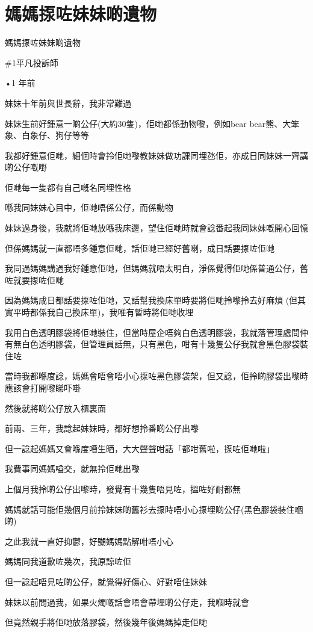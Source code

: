 \chapter{媽媽揼咗妹妹啲遺物}

媽媽揼咗妹妹啲遺物

\#1平凡投訴師

•1 年前

妹妹十年前與世長辭，我非常難過

妹妹生前好鍾意一啲公仔(大約30隻)，佢哋都係動物嚟，例如bear bear熊、大笨象、白象仔、狗仔等等

我都好鍾意佢哋，細個時會拎佢哋嚟教妹妹做功課同埋氹佢，亦成日同妹妹一齊講啲公仔嘅嘢

佢哋每一隻都有自己嘅名同埋性格

喺我同妹妹心目中，佢哋唔係公仔，而係動物

妹妹過身後，我就將佢哋放喺我床邊，望住佢哋時就會諗番起我同妹妹嘅開心回憶

但係媽媽就一直都唔多鍾意佢哋，話佢哋已經好舊喇，成日話要揼咗佢哋

我同過媽媽講過我好鍾意佢哋，但媽媽就唔太明白，淨係覺得佢哋係普通公仔，舊咗就要揼咗佢哋

因為媽媽成日都話要揼咗佢哋，又話幫我換床單時要將佢哋拎嚟拎去好麻煩 (但其實平時都係我自己換床單)，我唯有暫時將佢哋收埋

我用白色透明膠袋將佢哋裝住，但當時屋企唔夠白色透明膠袋，我就落管理處問仲有無白色透明膠袋，但管理員話無，只有黑色，咁有十幾隻公仔我就會黑色膠袋裝住咗

當時我都喺度諗，媽媽會唔會唔小心揼咗黑色膠袋架，但又諗，佢拎啲膠袋出嚟時應該會打開嚟睇吓啩

然後就將啲公仔放入櫃裏面

前兩、三年，我諗起妹妹時，都好想拎番啲公仔出嚟

但一諗起媽媽又會喺度嘈生晒，大大聲聲咁話「都咁舊啦，揼咗佢哋啦」

我費事同媽媽嗌交，就無拎佢哋出嚟

上個月我拎啲公仔出嚟時，發覺有十幾隻唔見咗，搵咗好耐都無

媽媽就話可能佢幾個月前拎妹妹啲舊衫去揼時唔小心揼埋啲公仔(黑色膠袋裝住嗰啲)

之此我就一直好抑鬱，好嬲媽媽點解咁唔小心

媽媽同我道歉咗幾次，我原諒咗佢

但一諗起唔見咗啲公仔，就覺得好傷心、好對唔住妹妹

妹妹以前問過我，如果火燭嘅話會唔會帶埋啲公仔走，我嗰時就會

但竟然親手將佢哋放落膠袋，然後幾年後媽媽掉走佢哋

